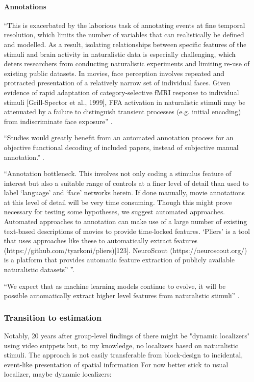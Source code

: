 \paragraph{Annotations}
%
``This is exacerbated by the laborious task of annotating events at fine
temporal resolution, which limits the number of variables that can realistically
be defined and modelled.
%
As a result, isolating relationships between specific features of the stimuli
and brain activity in naturalistic data is especially challenging, which deters
researchers from conducting naturalistic experiments and limiting re-use of
existing public datasets.
%
In movies, face perception involves repeated and protracted presentation of a
relatively narrow set of individual faces. Given evidence of rapid adaptation of
category-­selective fMRI response to individual stimuli [Grill-Spector et al.,
1999], FFA activation in naturalistic stimuli may be attenuated by a failure to
distinguish transient processes (e.g. initial encoding) from indiscriminate face
exposure'' \citep{delavega2022neuroscout}.

%
``Studies would greatly benefit from an automated annotation process for an
objective functional decoding of included papers, instead of subjective manual
annotation.'' \citep{bottenhorn2018cooperating}.

%
``Annotation bottleneck.
%
This involves not only coding a stimulus feature of interest but also a suitable
range of controls at a finer level of detail than used to label ‘language’ and
‘face’ networks herein.
%
If done manually, movie annotations at this level of detail will be very time
consuming.
%
Though this might prove necessary for testing some hypotheses, we suggest
automated approaches.
%
Automated approaches to annotation can make use of a large number of existing
text-based descriptions of movies to provide time-locked features.
%
‘Pliers’ is a tool that uses approaches like these to automatically extract
features (https://github.com/tyarkoni/pliers)[123].
%
NeuroScout (https://neuroscout.org/) is a platform that provides automatic
feature extraction of publicly available naturalistic datasets''
\citep{aliko2020naturalistic}''.

%
``We expect that as machine learning models continue to evolve, it will be
possible automatically extract higher level features from naturalistic stimuli''
\citep{delavega2022neuroscout}.


\subsubsection{Transition to estimation}
%
Notably, 20 years after group-level findings of \citep{bartels2004mapping} there
might be "dynamic localizers" using video snippets
\citep{pitcher2011differential, fox2009defining} but, to my knowledge, no
localizers based on naturalistic stimuli.
%
The approach is not easily transferable from block-design to incidental,
event-like presentation of spatial information
%
For now better stick to usual localizer, maybe dynamic localizers:

